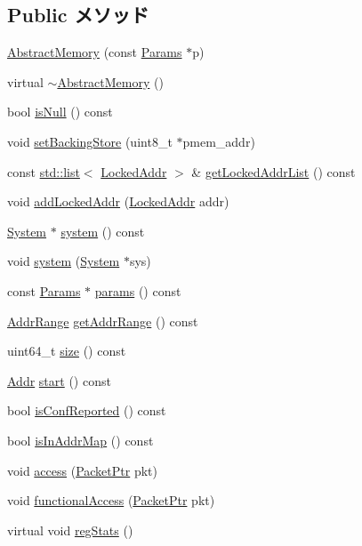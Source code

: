 \subsection*{Public メソッド}
\begin{DoxyCompactItemize}
\item 
\hyperlink{classAbstractMemory_a69baeab8b9f1056447fe16519fd89923}{AbstractMemory} (const \hyperlink{classAbstractMemory_ab4fcbcbcfef78d6bc871995f8eca40eb}{Params} $\ast$p)
\item 
virtual \hyperlink{classAbstractMemory_a7cff70b609d2b2b8ac45e1fe12b7bc96}{$\sim$AbstractMemory} ()
\item 
bool \hyperlink{classAbstractMemory_ac02f2a4d7312eb91f40980adfd4e31b2}{isNull} () const 
\item 
void \hyperlink{classAbstractMemory_a2651a6edea3b7884410b1abefac8b2de}{setBackingStore} (uint8\_\-t $\ast$pmem\_\-addr)
\item 
const \hyperlink{classstd_1_1list}{std::list}$<$ \hyperlink{classLockedAddr}{LockedAddr} $>$ \& \hyperlink{classAbstractMemory_a5b569455e6a1bd8629737fa02564a9a8}{getLockedAddrList} () const 
\item 
void \hyperlink{classAbstractMemory_a41e2bc27bc88cc5c7d1d8c7a905e7cfc}{addLockedAddr} (\hyperlink{classLockedAddr}{LockedAddr} addr)
\item 
\hyperlink{classSystem}{System} $\ast$ \hyperlink{classAbstractMemory_a83984c42bc765168929779ed9a37ebe8}{system} () const 
\item 
void \hyperlink{classAbstractMemory_ad086bdc3ed123ad02169847d658bf5cb}{system} (\hyperlink{classSystem}{System} $\ast$sys)
\item 
const \hyperlink{classAbstractMemory_ab4fcbcbcfef78d6bc871995f8eca40eb}{Params} $\ast$ \hyperlink{classAbstractMemory_acd3c3feb78ae7a8f88fe0f110a718dff}{params} () const 
\item 
\hyperlink{classAddrRange}{AddrRange} \hyperlink{classAbstractMemory_aa3df62a6c92a30a0ab9247f8ec9e6e7a}{getAddrRange} () const 
\item 
uint64\_\-t \hyperlink{classAbstractMemory_a0b6868dbef44fc07f11d050eb59e5f7e}{size} () const 
\item 
\hyperlink{base_2types_8hh_af1bb03d6a4ee096394a6749f0a169232}{Addr} \hyperlink{classAbstractMemory_a85325674b7aed05d6b4e40a48563189b}{start} () const 
\item 
bool \hyperlink{classAbstractMemory_aca224861e09cf94a49088bb51bb02350}{isConfReported} () const 
\item 
bool \hyperlink{classAbstractMemory_ad89e9980a76342142d63ff15deb19497}{isInAddrMap} () const 
\item 
void \hyperlink{classAbstractMemory_aac5d96736802cb79fb2287135bcc1dff}{access} (\hyperlink{classPacket}{PacketPtr} pkt)
\item 
void \hyperlink{classAbstractMemory_ace845b5316308e12fd958fa5df09a8e8}{functionalAccess} (\hyperlink{classPacket}{PacketPtr} pkt)
\item 
virtual void \hyperlink{classAbstractMemory_a4dc637449366fcdfc4e764cdf12d9b11}{regStats} ()
\end{DoxyCompactItemize}
